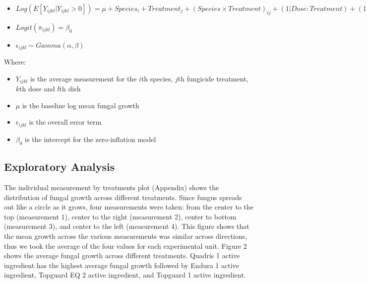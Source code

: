 \documentclass[
  10pt,
  letterpaper,
  twocolumn]{article}
\providecommand{\tightlist}{%
  \setlength{\itemsep}{0pt}\setlength{\parskip}{0pt}}\usepackage{longtable,booktabs,array}
\begin{document}
\begin{itemize}
\tightlist
\item
  \(Log(E[Y_{ijkl}|Y_{ijkl} > 0]) = \mu + Species_i + Treatment_j + (Species \times Treatment)_{ij} + (1|Dose:Treatment) + (1|Species:Dose:Treatment)\)
\item
  \(Logit(\pi_{ijkl}) = \beta_0\)
\item
  \(\epsilon_{ijkl} \sim Gamma(\alpha, \beta)\)
\end{itemize}

Where:

\begin{itemize}
\tightlist
\item
  \(Y_{ijkl}\) is the average measurement for the \(i\)th species,
  \(j\)th fungicide treatment, \(k\)th dose and \(l\)th dish
\item
  \(\mu\) is the baseline log mean fungal growth
\item
  \(\epsilon_{ijkl}\) is the overall error term
\item
  \(\beta_0\) is the intercept for the zero-inflation model
\end{itemize}

\hypertarget{exploratory-analysis}{%
\subsection{Exploratory Analysis}\label{exploratory-analysis}}

\vspace{-1em}

The individual measurement by treatments plot (Appendix) shows the
distribution of fungal growth across different treatments. Since fungus
spreads out like a circle as it grows, four measurements were taken:
from the center to the top (measurement 1), center to the right
(measurement 2), center to bottom (measurement 3), and center to the
left (measurement 4). This figure shows that the mean growth across the
various measurements was similar across directions, thus we took the
average of the four values for each experimental unit. Figure 2 shows
the average fungal growth across different treatments. Quadris 1 active
ingredient has the highest average fungal growth followed by Endura 1
active ingredient, Topguard EQ 2 active ingredient, and Topguard 1
active ingredient.
\end{document}
